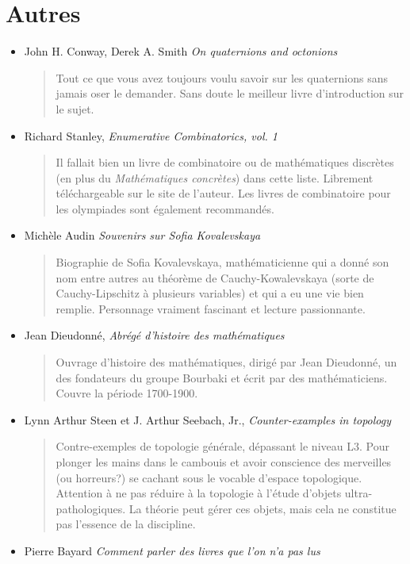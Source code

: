 \documentclass{article}
\begin{document}
\section{Autres}


\begin{itemize}
\item John H. Conway, Derek A. Smith \emph{On quaternions and octonions}
\begin{quote}
Tout ce que vous avez toujours voulu savoir sur les quaternions sans jamais oser le demander. Sans doute le meilleur livre d'introduction sur le sujet.
\end{quote}
\item Richard Stanley, \emph{Enumerative Combinatorics, vol. 1}
\begin{quote}
Il fallait bien un livre de combinatoire ou de mathématiques discrètes (en plus du \emph{Mathématiques concrètes}) dans cette liste. Librement téléchargeable sur le site de l'auteur. Les livres de combinatoire pour les olympiades sont également recommandés.
\end{quote}
\item Michèle Audin \emph{Souvenirs sur Sofia Kovalevskaya}
\begin{quote}
Biographie de Sofia Kovalevskaya, mathématicienne qui a donné son nom entre autres au théorème de Cauchy-Kowalevskaya (sorte de Cauchy-Lipschitz à plusieurs variables) et qui a eu une vie bien remplie. Personnage vraiment fascinant et lecture passionnante.
\end{quote}
\item Jean Dieudonné, \emph{Abrégé d'histoire des mathématiques}
\begin{quote}
Ouvrage d'histoire des mathématiques, dirigé par Jean Dieudonné, un des fondateurs du groupe Bourbaki et écrit par des mathématiciens. Couvre la période 1700-1900. 
\end{quote}
\item Lynn Arthur Steen et J. Arthur Seebach, Jr., \emph{Counter-examples in topology}
\begin{quote}
Contre-exemples de topologie générale, dépassant le niveau L3. Pour plonger les mains dans le cambouis et avoir conscience des  merveilles (ou horreurs?) se cachant sous le vocable d'\og espace topologique\fg. Attention à ne pas réduire à la topologie à l'étude d'objets ultra-pathologiques. La théorie peut gérer ces objets, mais cela ne constitue pas l'essence de la discipline.
\end{quote}
\item Pierre Bayard \emph{Comment parler des livres que l'on n'a pas lus}
\end{itemize}

\end{document}
